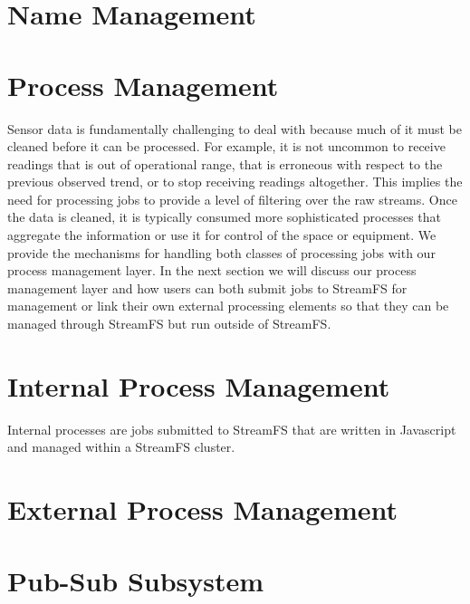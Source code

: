 \section{Name Management}



\section{Process Management}
%
Sensor data is fundamentally challenging to deal with because much of it must be cleaned before it can be processed.  For example,
it is not uncommon to receive readings that is out of operational range, that is erroneous with respect to the previous observed trend,
or to stop receiving readings altogether.  This implies the need for processing jobs to provide a level of filtering over the raw streams.
Once the data is cleaned, it is typically consumed more sophisticated processes that aggregate the information or use it for control
of the space or equipment.  We provide the mechanisms for handling both classes of processing jobs with our process management layer.
In the next section we will discuss our process management layer and how users can both submit jobs to StreamFS for management or link
their own external processing elements so that they can be managed through StreamFS but run outside of StreamFS.

\section{Internal Process Management}
Internal processes are jobs submitted to StreamFS that are written in Javascript and managed within a StreamFS cluster.




\section{External Process Management}


\section{Pub-Sub Subsystem}
%






